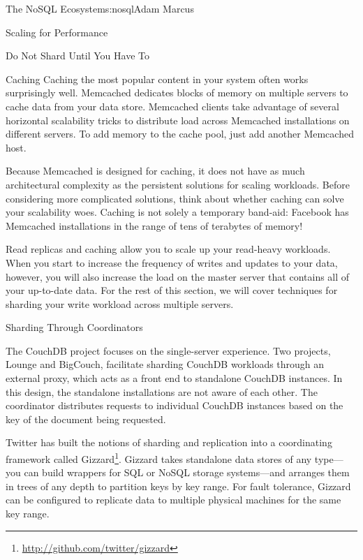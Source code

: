 \begin{aosachapter}{The NoSQL Ecosystem}{s:nosql}{Adam Marcus}
\begin{aosasect1}{Scaling for Performance}
\begin{aosasect2}{Do Not Shard Until You Have To}
\begin{aosasect3}{Caching}
Caching the most popular content in your system often works
surprisingly well.  Memcached dedicates blocks of memory on multiple
servers to cache data from your data store.  Memcached clients take
advantage of several horizontal scalability tricks to distribute load
across Memcached installations on different servers.  To add memory to
the cache pool, just add another Memcached host.

Because Memcached is designed for caching, it does not have as much
architectural complexity as the persistent solutions for scaling
workloads.  Before considering more complicated solutions, think about
whether caching can solve your scalability woes.  Caching is not solely
a temporary band-aid: Facebook has Memcached installations in the range
of tens of terabytes of memory!

\end{aosasect3}

Read replicas and caching allow you to scale up your read-heavy
workloads.  When you start to increase the frequency of writes and
updates to your data, however, you will also increase the load on the
master server that contains all of your up-to-date data.  For the rest
of this section, we will cover techniques for sharding your write
workload across multiple servers.

\end{aosasect2}

\begin{aosasect2}{Sharding Through Coordinators}

The CouchDB project focuses on the single-server experience.  Two
projects, Lounge and BigCouch, facilitate sharding CouchDB workloads
through an external proxy, which acts as a front end to standalone
CouchDB instances.  In this design, the standalone installations are
not aware of each other.  The coordinator distributes requests to
individual CouchDB instances based on the key of the document being
requested.

Twitter has built the notions of sharding and replication into a
coordinating framework called Gizzard\footnote{\url{http://github.com/twitter/gizzard}}.  Gizzard takes standalone data stores of any
type---you can build wrappers for SQL or NoSQL storage systems---and
arranges them in trees of any depth to partition keys by key range.
For fault tolerance, Gizzard can be configured to replicate data to
multiple physical machines for the same key range.

\end{aosasect2}


\end{aosasect1}
\end{aosachapter}
